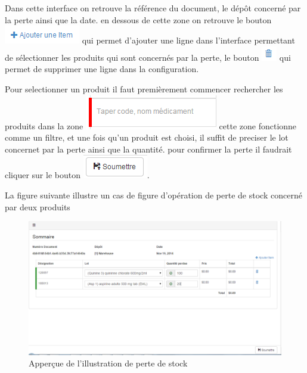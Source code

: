 \documentclass[12pt,a4paper]{report}
\begin{document}
Dans cette interface on retrouve la référence du document, le dépôt concerné par la perte ainsi que la date. en dessous de cette zone on retrouve le bouton \includegraphics[scale=0.7]{pic/AjouterItem.png} qui permet d'ajouter une ligne dans l'interface permettant de sélectionner les produits qui sont concernés par la perte, le bouton \includegraphics[scale=0.7]{pic/RecycleBlue.png} qui permet de supprimer une ligne dans la configuration.


Pour selectionner un produit il faut premièrement commencer rechercher les produits dans la zone \includegraphics[scale=0.7]{pic/RecherMedicament.png} cette zone fonctionne comme un filtre, et une fois qu'un produit est choisi, il suffit de preciser le lot concernet par la perte ainsi que la quantité. pour confirmer la perte il faudrait cliquer sur le bouton \includegraphics[scale=0.7]{pic/SubmitSave.png}.

La figure suivante illustre un cas de figure d'opération de perte de stock concerné par deux produits

\begin{figure}[h]
\begin{center}
\includegraphics[width=14cm]{pic/PerteStockForm.png}
\end{center}
\caption{Apperçue de l'illustration de perte de stock}
\label{Apperçue de l'illustration de perte de stock}
\end{figure}
\end{document}
